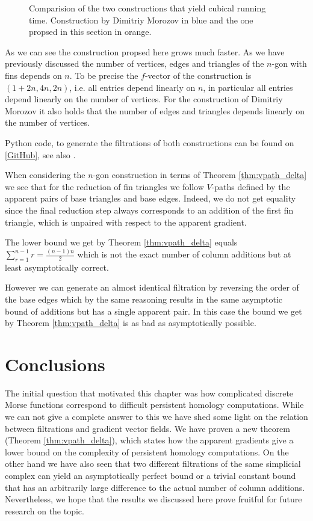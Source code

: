 \begin{figure}[H]
\noindent%
\centering%

\caption{Comparision of the two constructions that yield cubical running time. Construction by Dimitriy Morozov in blue and the one propsed in this section in orange.}
\label{fig:compare}
\end{figure}
As we can see the construction propsed here grows much faster. As we have previously discussed the number of vertices, edges and triangles of the $n$-gon with fins depends on $n$. To be precise the $f$-vector of the construction is $(1+2n,4n,2n)$, i.e. all entries depend linearly on $n$, in particular all entries depend linearly on the number of vertices. For the construction of Dimitriy Morozov it also holds that the number of edges and triangles depends linearly on the number of vertices. 

Python code, to generate the filtrations of both constructions can be found on \href{https://github.com/IvanSpirandelli/Masterarbeit/blob/master/Examples/worst_case_examples.py}{[GitHub]}, see also \cite{github}. 

When considering the $n$-gon construction in terms of Theorem \ref{thm:vpath_delta} we see that for the reduction of fin triangles we follow $V$-paths defined by the apparent pairs of base triangles and base edges. Indeed, we do not get equality since the final reduction step always corresponds to an addition of the first fin triangle, which is unpaired with respect to the apparent gradient.

The lower bound we get by Theorem \ref{thm:vpath_delta} equals $\sum_{r=1}^{n-1} r = \frac{(n-1)n}{2}$ which is not the exact number of column additions but at least asymptotically correct. 

However we can generate an almost identical filtration by reversing the order of the base edges which by the same reasoning results in the same asymptotic bound of additions but has a single apparent pair. In this case the bound we get by Theorem \ref{thm:vpath_delta} is as bad as asymptotically possible.

\section{Conclusions}
The initial question that motivated this chapter was how complicated discrete Morse functions correspond to difficult persistent homology computations. While we can not give a complete answer to this we have shed some light on the relation between filtrations and gradient vector fields. We have proven a new theorem (Theorem \ref{thm:vpath_delta}), which states how the apparent gradients give a lower bound on the complexity of persistent homology computations. On the other hand we have also seen that two different filtrations of the same simplicial complex can yield an asymptotically perfect bound or a trivial constant bound that has an arbitrarily large difference to the actual number of column additions. Nevertheless, we hope that the results we discussed here prove fruitful for future research on the topic.
